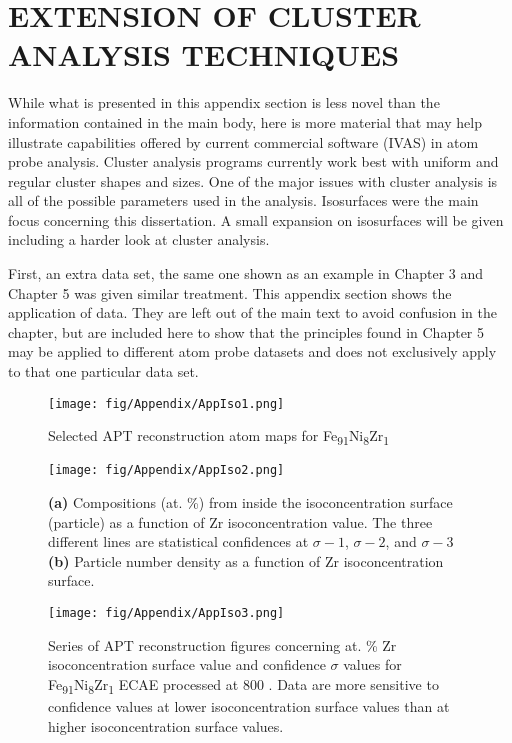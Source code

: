 \chapter{EXTENSION OF CLUSTER ANALYSIS TECHNIQUES}

While what is presented in this appendix section is less novel than the information contained in the main body, here is more material that may help illustrate capabilities offered by current commercial software (IVAS) in atom probe analysis. Cluster analysis programs currently work best with uniform and regular cluster shapes and sizes. One of the major issues with cluster analysis is all of the possible parameters used in the analysis. Isosurfaces were the main focus concerning this dissertation. A small expansion on isosurfaces will be given including a harder look at cluster analysis.

First, an extra data set, the same one shown as an example in Chapter 3 and Chapter 5 was given similar treatment. This appendix section shows the application of data. They are left out of the main text to avoid confusion in the chapter, but are included here to show that the principles found in Chapter 5 may be applied to different atom probe datasets and does not exclusively apply to that one particular data set.

\begin{figure}
	\centering
	\texttt{[image: fig/Appendix/AppIso1.png]}
	\caption{Selected APT reconstruction atom maps for Fe\textsubscript{91}Ni\textsubscript{8}Zr\textsubscript{1}}
	\label{fig:AppIso1}
\end{figure}

\begin{figure}
	\centering
	\texttt{[image: fig/Appendix/AppIso2.png]}
	\caption[Compositions (at. \%) from inside the isoconcentration surface (particle) as a function of Zr isoconcentration value.]{\textbf{(a)} Compositions (at. \%) from inside the isoconcentration surface (particle) as a function of Zr isoconcentration value. The three different lines are statistical confidences at $\sigma-1${}, $\sigma-2${}, and $\sigma-3${} \textbf{(b)} Particle number density as a function of Zr isoconcentration surface.}
	\label{fig:AppIso2}
\end{figure}

\begin{figure}
	\centering
	\texttt{[image: fig/Appendix/AppIso3.png]}
	\caption[Series of APT reconstruction figures concerning at. \% Zr isoconcentration surface value and confidence $\sigma{}$ values for Fe\textsubscript{91}Ni\textsubscript{8}Zr\textsubscript{1} ECAE processed at 800 \celsius{}.]{Series of APT reconstruction figures concerning at. \% Zr isoconcentration surface value and confidence $\sigma{}$ values for Fe\textsubscript{91}Ni\textsubscript{8}Zr\textsubscript{1} ECAE processed at 800 \celsius{}. Data are more sensitive to confidence values at lower isoconcentration surface values than at higher isoconcentration surface values.}
	\label{fig:AppIso3}
\end{figure}

